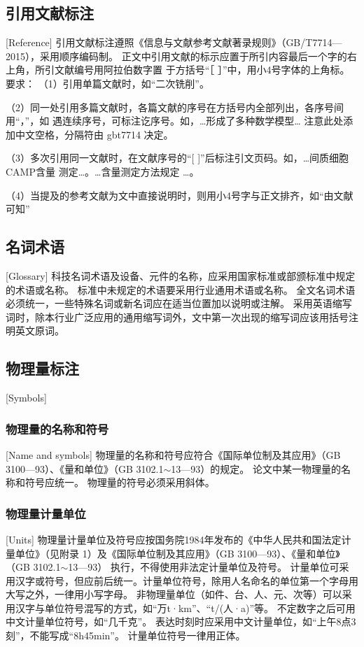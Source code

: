 \subsection{引用文献标注}[Reference]
引用文献标注遵照《信息与文献参考文献著录规则》（GB/T7714—2015），采用顺序编码制。
正文中引用文献的标示应置于所引内容最后一个字的右上角，所引文献编号用阿拉伯数字置
于方括号“［ ］”中，用小4号字体的上角标。
要求：
（1）引用单篇文献时，如“二次铣削\cite{cnproceed}”。

（2）同一处引用多篇文献时，各篇文献的序号在方括号内全部列出，各序号间用“，”，如
遇连续序号，可标注讫序号。如，…形成了多种数学模型\cite{cnarticle,cnproceed}…
注意此处添加中文空格，分隔符由 gbt7714 决定。

（3）多次引用同一文献时，在文献序号的“[ ]”后标注引文页码。如，…间质细胞CAMP含量
测定\cite[100-197]{cnarticle}…。…含量测定方法规定
\cite[92]{cnarticle}…。

（4）当提及的参考文献为文中直接说明时，则用小4号字与正文排齐，如“由文献可知”

\subsection{名词术语}[Glossary]
科技名词术语及设备、元件的名称，应采用国家标准或部颁标准中规定的术语或名称。
标准中未规定的术语要采用行业通用术语或名称。
全文名词术语必须统一，一些特殊名词或新名词应在适当位置加以说明或注解。
采用英语缩写词时，除本行业广泛应用的通用缩写词外，文中第一次出现的缩写词应该用括号注明英文原词。

\subsection{物理量标注}[Symbols]
\subsubsection{物理量的名称和符号}[Name and symbols]
物理量的名称和符号应符合《国际单位制及其应用》（GB 3100—93）、《量和单位》（GB
3102.1$\sim$13—93）的规定。
论文中某一物理量的名称和符号应统一。
物理量的符号必须采用斜体。

\subsubsection{物理量计量单位}[Units]
物理量计量单位及符号应按国务院1984年发布的《中华人民共和国法定计量单位》（见附录
1）及《国际单位制及其应用》（GB 3100—93）、《量和单位》（GB 3102.1$\sim$13—93）
执行，不得使用非法定计量单位及符号。
计量单位可采用汉字或符号，但应前后统一。计量单位符号，除用人名命名的单位第一个字母用大写之外，一律用小写字母。
非物理量单位（如件、台、人、元、次等）可以采用汉字与单位符号混写的方式，如“万t·km”、“t/(人·a)”等。
不定数字之后可用中文计量单位符号，如“几千克”。
表达时刻时应采用中文计量单位，如“上午8点3刻”，不能写成“8h45min”。
计量单位符号一律用正体。

